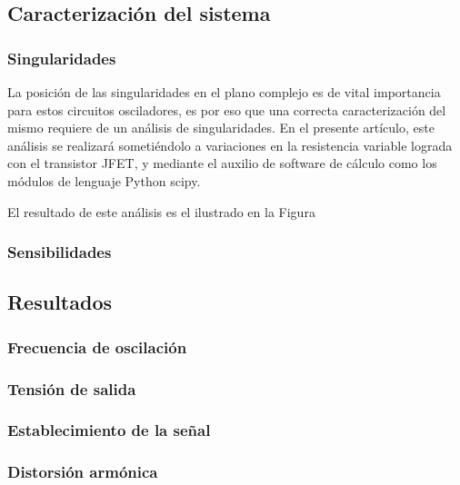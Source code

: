 \subsection{Caracterización del sistema}
\subsubsection{Singularidades}
La posición de las singularidades en el plano complejo es de vital importancia para estos circuitos osciladores, es por eso que una correcta caracterización 
del mismo requiere de un análisis de singularidades.
En el presente artículo, este análisis se realizará sometiéndolo a variaciones en la resistencia variable lograda con el transistor JFET, y mediante el 
auxilio de software de cálculo como los módulos de lenguaje Python scipy.

El resultado de este análisis es el ilustrado en la Figura


\subsubsection{Sensibilidades}



\subsection{Resultados}
\subsubsection{Frecuencia de oscilación}


\subsubsection{Tensión de salida}


\subsubsection{Establecimiento de la señal}


\subsubsection{Distorsión armónica}

